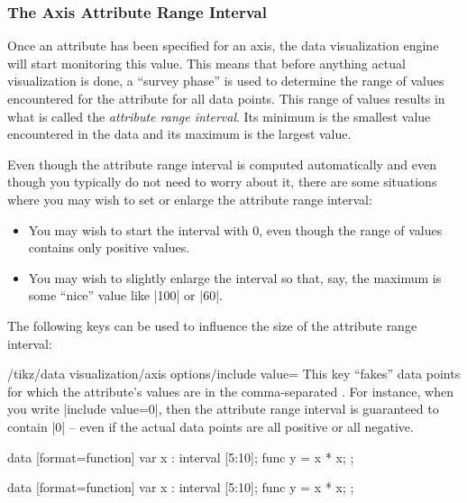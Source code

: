 \subsubsection{The Axis Attribute Range Interval}

Once an attribute has been specified for an axis, the data visualization engine
will start monitoring this value. This means that before anything actual
visualization is done, a ``survey phase'' is used to determine the range of
values encountered for the attribute for all data points. This range of values
results in what is called the \emph{attribute range interval}. Its minimum is
the smallest value encountered in the data and its maximum is the largest
value.

Even though the attribute range interval is computed automatically and even
though you typically do not need to worry about it, there are some situations
where you may wish to set or enlarge the attribute range interval:
%
\begin{itemize}
    \item You may wish to start the interval with $0$, even though the range of
        values contains only positive values.
    \item You may wish to slightly enlarge the interval so that, say, the
        maximum is some ``nice'' value like |100| or |60|.
\end{itemize}

The following keys can be used to influence the size of the attribute range
interval:
%
\begin{key}{/tikz/data visualization/axis options/include value=}
    This key ``fakes'' data points for which the attribute's values are in the
    comma-separated . For instance, when you write
    |include value=0|, then the attribute range interval is guaranteed to
    contain |0| -- even if the actual data points are all positive or all
    negative.
\begin{codeexample}[preamble={\usetikzlibrary{datavisualization.formats.functions}}]
\tikz \datavisualization [scientific axes, all axes={length=3cm},
                          visualize as line]
  data [format=function] {
    var x : interval [5:10];
    func y = \value x * \value x;
  };
\end{codeexample}
\begin{codeexample}[preamble={\usetikzlibrary{datavisualization.formats.functions}}]
\tikz \datavisualization [scientific axes, all axes={length=3cm},
                          visualize as line,
                          x axis={include value=20},
                          y axis={include value=0}]
  data [format=function] {
    var x : interval [5:10];
    func y = \value x * \value x;
  };
\end{codeexample}
\end{key}

